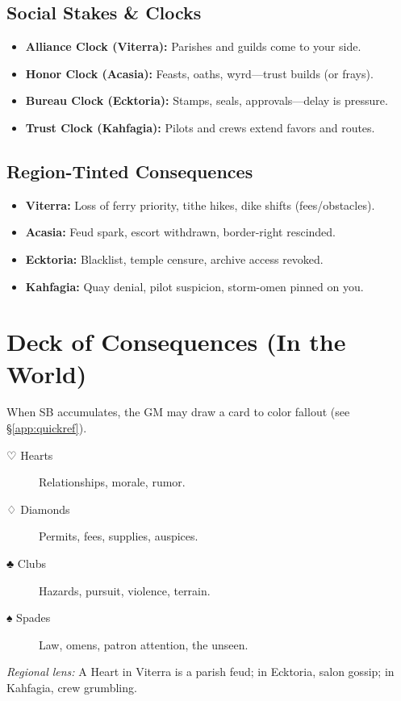 \begin{multicols}{2}
\subsection*{Social Stakes \& Clocks}
\begin{itemize}
  \item \textbf{Alliance Clock (Viterra):} Parishes and guilds come to your side.
  \item \textbf{Honor Clock (Acasia):} Feasts, oaths, wyrd—trust builds (or frays).
  \item \textbf{Bureau Clock (Ecktoria):} Stamps, seals, approvals—delay is pressure.
  \item \textbf{Trust Clock (Kahfagia):} Pilots and crews extend favors and routes.
\end{itemize}

\subsection*{Region-Tinted Consequences}
\begin{itemize}
  \item \textbf{Viterra:} Loss of ferry priority, tithe hikes, dike shifts (fees/obstacles).
  \item \textbf{Acasia:} Feud spark, escort withdrawn, border-right rescinded.
  \item \textbf{Ecktoria:} Blacklist, temple censure, archive access revoked.
  \item \textbf{Kahfagia:} Quay denial, pilot suspicion, storm-omen pinned on you.
\end{itemize}

\section{Deck of Consequences (In the World)}
When SB accumulates, the GM may draw a card to color fallout (see \S\ref{app:quickref}).
\begin{description}
  \item[♡ Hearts]  Relationships, morale, rumor.
  \item[♢ Diamonds]  Permits, fees, supplies, auspices.
  \item[♣ Clubs]  Hazards, pursuit, violence, terrain.
  \item[♠ Spades]  Law, omens, patron attention, the unseen.
\end{description}
\emph{Regional lens:} A Heart in Viterra is a parish feud; in Ecktoria, salon gossip; in Kahfagia, crew grumbling.


\end{multicols}
